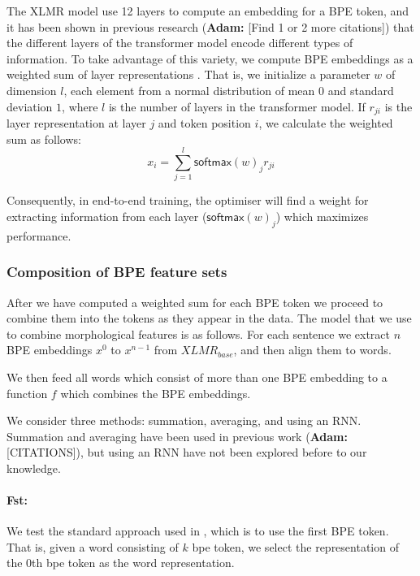 \documentclass[11pt]{article}
\newcommand\adam[1]{(\textbf{Adam:} #1)}
\newcommand\citep{\cite}
\newcommand\softmax{\mathsf{softmax}}
\begin{document}

                The XLMR model use 12 layers to compute an embedding
     for a BPE token, and it has been shown in previous research
     \citep{kondratyukstraka,raganato2018analysis,liu2019linguistic}
     \adam{[Find 1 or 2 more citations]} that the different layers of the
     transformer model encode different types of information. To take
     advantage of this variety, we compute BPE embeddings as a weighted sum of
     layer representations \citep{kondratyukstraka}.  That is, we
     initialize a parameter $w$ of dimension $l$, each element from a normal
     distribution of mean $0$ and standard deviation $1$, where $l$ is
     the number of layers in the transformer model. If $r_{ji}$ is the
     layer representation at layer $j$ and token position $i$, we
     calculate the weighted sum as follows:
    \begin{equation}
		x_i = \sum_{j=1}^{l} \softmax(w)_j r_{ji}
	\end{equation}

        Consequently, in end-to-end training, the optimiser will find
        a weight for extracting information from each layer
        ($\softmax(w)_j$) which maximizes performance.

     \subsubsection{Composition of BPE feature sets}
      After we have computed a weighted sum for
     each BPE token we proceed to combine them into the tokens as they
     appear in the data.
	The model that we use to combine morphological features is as
        follows. For each sentence we extract $n$ BPE embeddings $x^0$
        to $x^{n-1}$ from $XLMR_{base}$, and then align them to
        words.

        We then feed all words which consist of more than one
        BPE embedding to a function $f$ which combines the BPE
        embeddings.

        We consider three methods: summation,
        averaging, and using an RNN. Summation and
        averaging have been used in previous work \adam{[CITATIONS]}, but
        using an RNN have not been explored before to our knowledge.

        \paragraph{Fst:} We test the standard approach used in
     \citep{devlin2018bert}, which is to use the first BPE token. That
     is, given a word consisting of $k$ bpe token, we select the
     representation of the $0$th bpe token as the word representation.
    
\end{document}
